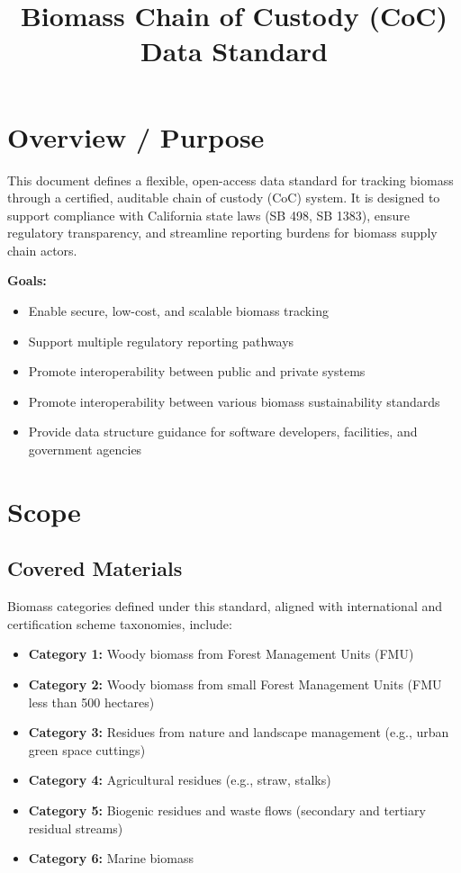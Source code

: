 \documentclass{article}
\title{Biomass Chain of Custody (CoC) Data Standard}
\date{}
\begin{document}
\maketitle

\section{Overview / Purpose}
This document defines a flexible, open-access data standard for tracking biomass through a certified, auditable chain of custody (CoC) system. It is designed to support compliance with California state laws (SB 498, SB 1383), ensure regulatory transparency, and streamline reporting burdens for biomass supply chain actors.

\textbf{Goals:}
\begin{itemize}[noitemsep]
    \item Enable secure, low-cost, and scalable biomass tracking
    \item Support multiple regulatory reporting pathways
    \item Promote interoperability between public and private systems
    \item Promote interoperability between various biomass sustainability standards
    \item Provide data structure guidance for software developers, facilities, and government agencies
\end{itemize}

\section{Scope}
\subsection*{Covered Materials}
Biomass categories defined under this standard, aligned with international and certification scheme taxonomies, include:
\begin{itemize}[noitemsep]
    \item \textbf{Category 1:} Woody biomass from Forest Management Units (FMU)
    \item \textbf{Category 2:} Woody biomass from small Forest Management Units (FMU less than 500 hectares)
    \item \textbf{Category 3:} Residues from nature and landscape management (e.g., urban green space cuttings)
    \item \textbf{Category 4:} Agricultural residues (e.g., straw, stalks)
    \item \textbf{Category 5:} Biogenic residues and waste flows (secondary and tertiary residual streams)
    \item \textbf{Category 6:} Marine biomass 
\end{itemize}
\end{document}
